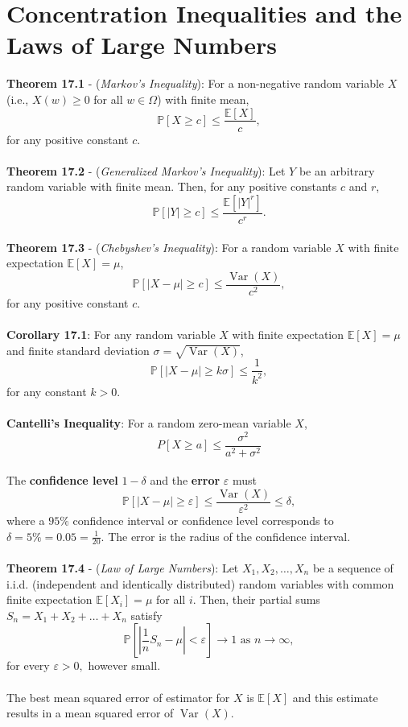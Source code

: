 \documentclass{article}
\theoremstyle{definition}
\DeclareMathOperator{\Var}{Var}
\begin{document}
\section*{Concentration Inequalities and the Laws of Large Numbers}
\textbf{Theorem 17.1} - (\textit{Markov’s Inequality}): For a non-negative random variable $X$ (i.e., $X(w) \geq 0$ for all $w \in \Omega$) with finite mean, $$\mathbb{P}[X \geq c] \leq \frac{\mathbb{E}[X]}{c},$$ for any positive constant $c$. \\ \\
\textbf{Theorem 17.2} - (\textit{Generalized Markov’s Inequality}): Let $Y$ be an arbitrary random variable with finite mean. Then, for any positive constants $c$ and $r$, $$\mathbb{P}[|Y| \geq c] \leq \frac{\mathbb{E}[|Y|^r]}{c^r}.$$ \\
\textbf{Theorem 17.3} - (\textit{Chebyshev’s Inequality}): For a random variable $X$ with finite expectation $\mathbb{E}[X] = \mu$, $$\mathbb{P}[|X - \mu| \geq c] \leq \frac{\Var(X)}{c^2},$$ for any positive constant $c$. \\ \\
\textbf{Corollary 17.1}: For any random variable $X$ with finite expectation $\mathbb{E}[X] = \mu$ and finite standard deviation $\sigma = \sqrt{\Var(X)}$, $$\mathbb{P}[|X - \mu| \geq k\sigma] \leq \frac{1}{k^2},$$ for any constant $k > 0$. \\ \\
\textbf{Cantelli’s Inequality}: For a random zero-mean variable $X$, $$P[X \geq a] \leq \frac{\sigma^2}{a^2 + \sigma^2}$$ \\
The \textbf{confidence level} $1 - \delta$ and the \textbf{error} $\varepsilon$ must $$\mathbb{P}[|X - \mu| \geq \varepsilon] \leq \frac{\Var(X)}{\varepsilon^2} \leq \delta,$$ where a $95\%$ confidence interval or confidence level corresponds to $\delta = 5\% = 0.05 = \frac{1}{20}.$ The error is the radius of the confidence interval. \\ \\
\textbf{Theorem 17.4} - (\textit{Law of Large Numbers}): Let $X_1,X_2, \dots, X_n$ be a sequence of i.i.d. (independent and identically distributed) random variables with common finite expectation $\mathbb{E}[X_i] = \mu$ for all $i$. Then, their partial sums $S_n = X_1 + X_2 + \dots + X_n$ satisfy $$\mathbb{P}[|\frac{1}{n}S_n - \mu| < \varepsilon] \rightarrow 1 \text{ as } n \rightarrow \infty,$$ for every $\varepsilon > 0,$ however small. \\ \\
The best mean squared error of estimator for $X$ is $\mathbb{E}[X]$ and this estimate results in a mean squared error of $\Var(X)$.
\end{document}
